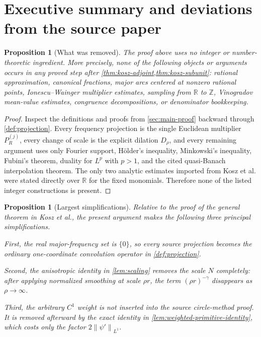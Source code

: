 \documentclass[11pt]{article}
\newtheorem{proposition}[theorem]{Proposition}
\newcommand{\R}{\mathbb{R}}
\newcommand{\norm}[2]{\left\lVert #1\right\rVert_{#2}}
\begin{document}
	\section{Executive summary and deviations from the source paper}
	
	\begin{proposition}[What was removed]\label{prop:removed-material}
		The proof above uses no integer or number-theoretic ingredient.  More precisely, none of the following objects or arguments occurs in any proved step after \cref{thm:kosz-adjoint,thm:kosz-subunit}: rational approximation, canonical fractions, major arcs centered at nonzero rational points, Ionescu--Wainger multiplier estimates, sampling from \(\R\) to \(\mathbb Z\), Vinogradov mean-value estimates, congruence decompositions, or denominator bookkeeping.
	\end{proposition}
	
	\begin{proof}
		Inspect the definitions and proofs from \cref{sec:main-proof} backward through \cref{def:projection}.  Every frequency projection is the single Euclidean multiplier \(P_R^{(j)}\), every change of scale is the explicit dilation \(D_\rho\), and every remaining argument uses only Fourier support, H\"older's inequality, Minkowski's inequality, Fubini's theorem, duality for \(L^p\) with \(p>1\), and the cited quasi-Banach interpolation theorem.  The only two analytic estimates imported from Kosz et al. were stated directly over \(\R\) for the fixed monomials.  Therefore none of the listed integer constructions is present.
	\end{proof}
	
	\begin{proposition}[Largest simplifications]\label{prop:simplifications}
		Relative to the proof of the general theorem in Kosz et al., the present argument makes the following three principal simplifications.
		
		First, the real major-frequency set is \(\{0\}\), so every source projection becomes the ordinary one-coordinate convolution operator in \cref{def:projection}.
		
		Second, the anisotropic identity in \cref{lem:scaling} removes the scale \(N\) completely: after applying normalized smoothing at scale \(\rho r\), the term \((\rho r)^{-\gamma}\) disappears as \(\rho\to\infty\).
		
		Third, the arbitrary \(C^1\) weight is not inserted into the source circle-method proof.  It is removed afterward by the exact identity in \cref{lem:weighted-primitive-identity}, which costs only the factor \(2\norm{\psi'}{L^1}\).
	\end{proposition}
	
\end{document}
